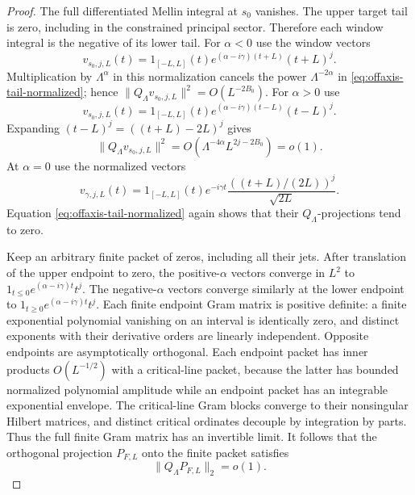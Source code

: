\begin{proof}
The full differentiated Mellin integral at $s_0$ vanishes.
The upper target tail is zero, including in the constrained principal
sector.  Therefore each window integral is the negative of its lower
tail.  For $\alpha<0$ use the window vectors
\[
 v_{s_0,j,L}(t)=1_{[-L,L]}(t)
            e^{(\alpha-i\gamma)(t+L)}(t+L)^j.
\]
Multiplication by $\Lambda^{\alpha}$ in this normalization cancels
the power $\Lambda^{-2\alpha}$ in
\eqref{eq:offaxis-tail-normalized}; hence
$\|Q_\Lambda v_{s_0,j,L}\|^2=O(L^{-2B_0})$.
For $\alpha>0$ use
\[
 v_{s_0,j,L}(t)=1_{[-L,L]}(t)
            e^{(\alpha-i\gamma)(t-L)}(t-L)^j.
\]
Expanding $(t-L)^j=((t+L)-2L)^j$ gives
\[
 \|Q_\Lambda v_{s_0,j,L}\|^2
                  =O(\Lambda^{-4\alpha}L^{2j-2B_0})=o(1).
\]
At $\alpha=0$ use the normalized vectors
\[
 v_{\gamma,j,L}(t)=1_{[-L,L]}(t)e^{-i\gamma t}
       \frac{((t+L)/(2L))^j}{\sqrt{2L}}.
\]
Equation \eqref{eq:offaxis-tail-normalized} again shows that their
$Q_\Lambda$-projections tend to zero.

Keep an arbitrary finite packet of zeros, including all their jets.
After translation of the upper endpoint to zero, the positive-$\alpha$
vectors converge in $L^2$ to
$1_{t\leq0}e^{(\alpha-i\gamma)t}t^j$.
The negative-$\alpha$ vectors converge similarly at the lower endpoint
to $1_{t\geq0}e^{(\alpha-i\gamma)t}t^j$.
Each finite endpoint Gram matrix is positive definite: a finite
exponential polynomial vanishing on an interval is identically zero,
and distinct exponents with their derivative orders are linearly
independent.  Opposite endpoints are asymptotically orthogonal.
Each endpoint packet has inner products $O(L^{-1/2})$ with a
critical-line packet, because the latter has bounded normalized
polynomial amplitude while an endpoint packet has an integrable
exponential envelope.
The critical-line Gram blocks converge to their nonsingular Hilbert
matrices, and distinct critical ordinates decouple by integration by
parts.  Thus the full finite Gram matrix has an invertible limit.
It follows that the orthogonal projection $P_{F,L}$ onto the finite
packet satisfies
\[
                    \|Q_\Lambda P_{F,L}\|_2=o(1).
\]


\end{proof}
